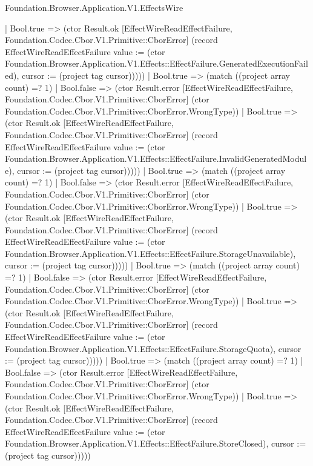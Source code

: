 \begin{lexlean}{Foundation.Browser.Application.V1.EffectsWire}
\begin{semanticmodule}
{                                | Bool.true => (ctor Result.ok [EffectWireReadEffectFailure, Foundation.Codec.Cbor.V1.Primitive::CborError] (record EffectWireReadEffectFailure {value := (ctor Foundation.Browser.Application.V1.Effects::EffectFailure.GeneratedExecutionFailed), cursor := (project tag cursor)}))))
                            | Bool.true => (match ((project array count) =? 1)
                              | Bool.false => (ctor Result.error [EffectWireReadEffectFailure, Foundation.Codec.Cbor.V1.Primitive::CborError] (ctor Foundation.Codec.Cbor.V1.Primitive::CborError.WrongType))
                              | Bool.true => (ctor Result.ok [EffectWireReadEffectFailure, Foundation.Codec.Cbor.V1.Primitive::CborError] (record EffectWireReadEffectFailure {value := (ctor Foundation.Browser.Application.V1.Effects::EffectFailure.InvalidGeneratedModule), cursor := (project tag cursor)}))))
                          | Bool.true => (match ((project array count) =? 1)
                            | Bool.false => (ctor Result.error [EffectWireReadEffectFailure, Foundation.Codec.Cbor.V1.Primitive::CborError] (ctor Foundation.Codec.Cbor.V1.Primitive::CborError.WrongType))
                            | Bool.true => (ctor Result.ok [EffectWireReadEffectFailure, Foundation.Codec.Cbor.V1.Primitive::CborError] (record EffectWireReadEffectFailure {value := (ctor Foundation.Browser.Application.V1.Effects::EffectFailure.StorageUnavailable), cursor := (project tag cursor)}))))
                        | Bool.true => (match ((project array count) =? 1)
                          | Bool.false => (ctor Result.error [EffectWireReadEffectFailure, Foundation.Codec.Cbor.V1.Primitive::CborError] (ctor Foundation.Codec.Cbor.V1.Primitive::CborError.WrongType))
                          | Bool.true => (ctor Result.ok [EffectWireReadEffectFailure, Foundation.Codec.Cbor.V1.Primitive::CborError] (record EffectWireReadEffectFailure {value := (ctor Foundation.Browser.Application.V1.Effects::EffectFailure.StorageQuota), cursor := (project tag cursor)}))))
                      | Bool.true => (match ((project array count) =? 1)
                        | Bool.false => (ctor Result.error [EffectWireReadEffectFailure, Foundation.Codec.Cbor.V1.Primitive::CborError] (ctor Foundation.Codec.Cbor.V1.Primitive::CborError.WrongType))
                        | Bool.true => (ctor Result.ok [EffectWireReadEffectFailure, Foundation.Codec.Cbor.V1.Primitive::CborError] (record EffectWireReadEffectFailure {value := (ctor Foundation.Browser.Application.V1.Effects::EffectFailure.StoreClosed), cursor := (project tag cursor)}))))
}
\end{semanticmodule}
\end{lexlean}
